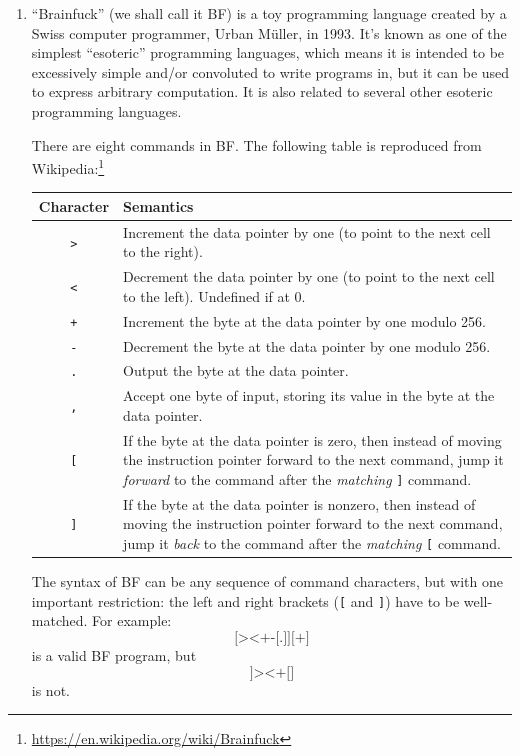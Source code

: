 \documentclass{article}
\begin{document}
\begin{enumerate}


\item
``Brainfuck'' (we shall call it BF) is a toy programming language created by a Swiss computer programmer, Urban Müller, in 1993.
It's known as one of the simplest ``esoteric'' programming languages, which means it is intended to be excessively simple and/or convoluted to write programs in, but it can be used to express arbitrary computation.
It is also related to several other esoteric programming languages.

There are eight commands in BF. The following table is reproduced from Wikipedia:\footnote{
    \url{https://en.wikipedia.org/wiki/Brainfuck}
}

\begin{table}[ht]
\centering
\begin{tabularx}{\linewidth}{@{}cX@{}}
\toprule
Character & Semantics \\
\midrule
\texttt{>} & Increment the data pointer by one (to point to the next cell to the right). \\
\texttt{<} & Decrement the data pointer by one (to point to the next cell to the left). Undefined if at 0. \\
\texttt{+} & Increment the byte at the data pointer by one modulo 256. \\
\texttt{-} & Decrement the byte at the data pointer by one modulo 256. \\
\texttt{.} & Output the byte at the data pointer. \\
\texttt{,} & Accept one byte of input, storing its value in the byte at the data pointer. \\
\texttt{[} & If the byte at the data pointer is zero, then instead of moving the instruction pointer forward to the next command, jump it \emph{forward} to the command after the \emph{matching} \texttt{]} command. \\
\texttt{]} & If the byte at the data pointer is nonzero, then instead of moving the instruction pointer forward to the next command, jump it \emph{back} to the command after the \emph{matching} \texttt{[} command. \\
\bottomrule
\end{tabularx}
\end{table}

The syntax of BF can be any sequence of command characters, but with one important restriction:
the left and right brackets (\texttt{[} and \texttt{]}) have to be well-matched. For example:
$$
\texttt{[><+-[.]][+]}
$$
is a valid BF program, but
$$
\texttt{]><+[]}
$$
is not.


\end{enumerate}
\end{document}

